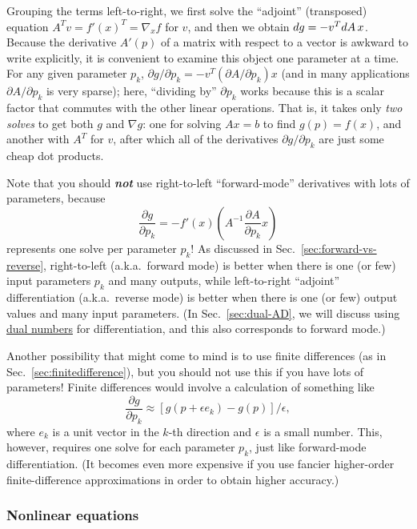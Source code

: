Grouping the terms left-to-right, we first solve the ``adjoint'' (transposed) equation $A^T v = f'(x)^T = \nabla_x f$ for $v$,
and then we obtain $d g = - v^T d A \, x$. Because the derivative $A'(p)$ of a matrix with respect to a vector is awkward to write explicitly, it is convenient to examine this object one parameter at a time.  For any given parameter $p_k$, $\partial g/\partial p_k = -v^T (\partial A/\partial p_k) x$ (and in many applications $\partial A /\partial p_k$ is very sparse); here, ``dividing by'' $\partial p_k$ works because this is a scalar factor that commutes with the other linear operations. That is, it takes only \emph{two solves} to get both $g$ and $\nabla g$: one for solving $A x = b$ to find $g(p)=f(x)$, and another with $A^T$ for $v$, after which all of the derivatives $\partial g/\partial p_k$ are just some cheap dot products.

Note that you should \textbf{\textit{not}} use right-to-left ``forward-mode'' derivatives with lots of parameters, because 
\[
\frac{\partial g}{\partial p_k} = - f'(x) \left(A^{-1} \frac{\partial A}{\partial p_k}x\right)
\]
represents one solve per parameter $p_k$! As discussed in Sec.~\ref{sec:forward-vs-reverse}, right-to-left (a.k.a.~forward mode) is better when there is one (or few) input parameters $p_k$ and many outputs, while left-to-right ``adjoint'' differentiation (a.k.a.~reverse mode) is better when there is one (or few) output values and many input parameters. (In Sec.~\ref{sec:dual-AD}, we will discuss using \href{https://en.wikipedia.org/wiki/Dual_number}{dual numbers} for differentiation, and this also corresponds to forward mode.) 

Another possibility that might come to mind is to use finite differences (as in Sec.~\ref{sec:finitedifference}), but you should not use this if you have lots of parameters! Finite differences would involve a calculation of something like
\[
\frac{\partial g}{\partial p_k} \approx [g(p + \epsilon e_k) - g(p)]/\epsilon,
\]
where $e_k$ is a unit vector in the $k$-th direction and $\epsilon$ is a small number.
This, however, requires one  solve for each parameter $p_k$, just like forward-mode differentiation.  (It becomes even more expensive if you use fancier higher-order finite-difference approximations in order to obtain higher accuracy.)

\subsubsection{Nonlinear equations}

